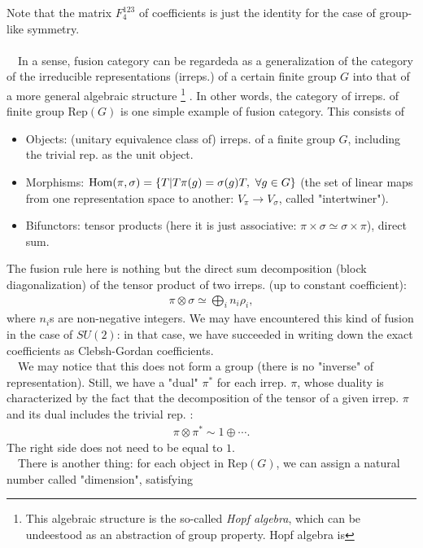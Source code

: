 \documentclass{ltjsarticle}
\theoremstyle{mystyle} %
\numberwithin{equation}{section}
\begin{document}
  Note that the matrix $F_{4}^{123}$ of coefficients is just the identity for the case of group-like symmetry. 
  \\\\
  　In a sense, fusion category can be regardeda as a generalization of the category of
  the irreducible representations (irreps.) of a certain finite group $G$ 
  into that of a more general algebraic structure
  \footnote{This algebraic structure is the so-called \textit{Hopf algebra}, 
  which can be undeestood as an abstraction of group property. 
  Hopf algebra is }
  . 
  In other words, the category of irreps. of finite group $\mathrm{Rep}(G)$ is one simple example of fusion category. 
  This consists of 
  \begin{itemize}
    \item Objects: (unitary equivalence class of) irreps. of a finite group $G$, including the trivial rep. as the unit object. 
    \item Morphisms: $\mathrm{Hom}(\pi, \sigma) = \left\{{T|T\pi(g) = \sigma(g)T, ~\forall g\in G}\right\}$ 
    (the set of linear maps from one representation space to another: $V_\pi\to V_\sigma$, called "intertwiner"). 
    \item Bifunctors: tensor products (here it is just associative: $\pi\times \sigma \simeq \sigma\times \pi$), direct sum. 
  \end{itemize}
  The fusion rule here is nothing but the direct sum decomposition (block diagonalization) of the tensor product of two irreps. 
  (up to constant coefficient): 
  \begin{align}
    \pi \otimes \sigma \simeq \bigoplus_i n_i \rho_i, 
  \end{align}
  where $n_i$s are non-negative integers. 
  We may have encountered this kind of fusion in the case of $SU(2)$: 
  in that case, we have succeeded in writing down the exact coefficients as 
  Clebsh-Gordan coefficients. \\
　We may notice that this does not form a group (there is no "inverse" of representation). 
Still, we have a "dual" $\pi^*$ for each irrep. $\pi$, whose duality is characterized by the fact that
 the decomposition of the tensor of a given irrep. $\pi$ and its dual includes the trivial rep. : 
 \begin{align}
    \pi\otimes \pi^* \sim 1\oplus \cdots. 
 \end{align}
 The right side does not need to be equal to $1$. 
  \\
  　There is another thing: for each object in $\mathrm{Rep}(G)$, we can assign a natural number called "dimension", satisfying
\end{document}
